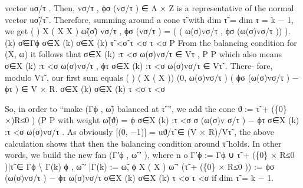 \documentclass[
  11pt,
]{article}
\newenvironment{Shaded}{}{}
\newcommand{\NormalTok}[1]{#1}
\begin{document}
\begin{Shaded}
\begin{Highlighting}[]
\NormalTok{vector uσ/τ . Then, vσ/τ , ϕσ (vσ/τ ) ∈ Λ × Z is a representative of the normal vector}
\NormalTok{uσ̃/τ̃ . Therefore, summing around a cone τ̃ with dim τ̃ = dim τ = k − 1, we get}
\NormalTok{                                        (                                        )}
\NormalTok{       X                                  ( X            X               )}
\NormalTok{                 ω̃(σ̃) vσ/τ , ϕσ (vσ/τ ) = (}
\NormalTok{                                            (  ω(σ)vσ/τ ,   ϕσ (ω(σ)vσ/τ ))}
\NormalTok{                                                                          ).}
\NormalTok{           (k)}
\NormalTok{     σ̃∈Γϕ                                     σ∈X (k)           σ∈X (k)}
\NormalTok{       τ̃ \textless{}σ̃                                   τ \textless{}σ              τ \textless{}σ}
\NormalTok{                                                           P}
\NormalTok{From the balancing condition for (X, ω) it follows that σ∈X (k) :τ \textless{}σ ω(σ)vσ/τ ∈ Vτ ,}
\NormalTok{                     P                              P                       }
\NormalTok{which also means        σ∈X (k) :τ \textless{}σ ω(σ)vσ/τ , ϕτ  σ∈X (k) :τ \textless{}σ ω(σ)vσ/τ    ∈ Vτ̃ . There{-}}
\NormalTok{fore, modulo Vτ̃ , our first sum equals}
\NormalTok{           (                                                        )}
\NormalTok{           (        X                           ( X               ))}
\NormalTok{           (0,                                        ω(σ)vσ/τ )}
\NormalTok{           (              ϕσ (ω(σ)vσ/τ ) − ϕτ                       ) ∈ V × R.}
\NormalTok{                    σ∈X (k)                          σ∈X (k)}
\NormalTok{                     τ \textless{}σ                             τ \textless{}σ}

\NormalTok{So, in order to “make (Γϕ , ω̃) balanced at τ̃ ”, we add the cone ϑ := τ̃ + (\{0\} ×)R≤0 )}
\NormalTok{                                                            (P}
\NormalTok{                     P}
\NormalTok{with weight ω̃(ϑ) =                  ϕ}
\NormalTok{                       σ∈X (k) :τ \textless{}σ σ (ω(σ)v    σ/τ ) − ϕτ    σ∈X (k) :τ \textless{}σ ω(σ)vσ/τ . As}
\NormalTok{obviously [(0, −1)] = uϑ/τ̃ ∈ (V × R)/Vτ̃ , the above calculation shows that then the}
\NormalTok{balancing condition around τ̃ holds. In other words, we build the new fan (Γ′ϕ , ω̃ ′ ), where}
\NormalTok{                                          n                                o}
\NormalTok{                        Γ′ϕ := Γϕ ∪ τ̃ + (\{0\} × R≤0 )|τ̃ ∈ Γϕ \textbackslash{} Γ(k)     ϕ    ,}
\NormalTok{                        ω̃ ′ |Γ(k)   := ω̃,}
\NormalTok{                               ϕ}
\NormalTok{                                          X                     ( X          )}
\NormalTok{      ω̃ ′ (τ̃ + (\{0\} × R≤0 ))       :=     ϕσ (ω(σ)vσ/τ ) − ϕτ     ω(σ)vσ/τ}
\NormalTok{                                          σ∈X (k)                       σ∈X (k)}
\NormalTok{                                           τ \textless{}σ                          τ \textless{}σ}
\NormalTok{                                          if dim τ̃ = k − 1.}


\end{Highlighting}
\end{Shaded}
\end{document}
